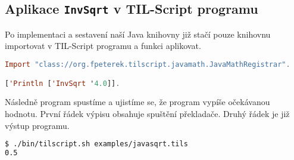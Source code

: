 \subsection{Aplikace \lstinline{InvSqrt} v TIL-Script programu}

Po implementaci a sestavení naší Java knihovny již stačí pouze knihovnu importovat v TIL-Script
programu a funkci aplikovat.

\begin{lstlisting}[caption={Aplikace InvSqrt}, language=Haskell]
Import "class://org.fpeterek.tilscript.javamath.JavaMathRegistrar".

['Println ['InvSqrt '4.0]].
\end{lstlisting}

Následně program spustíme a ujistíme se, že program vypíše očekávanou hodnotu. První řádek výpisu
obsahuje spuštění překladače. Druhý řádek je již výstup programu.

\begin{lstlisting}[caption={Aplikace InvSqrt}, language=Bash]
$ ./bin/tilscript.sh examples/javasqrt.tils
0.5
\end{lstlisting}

\endinput
